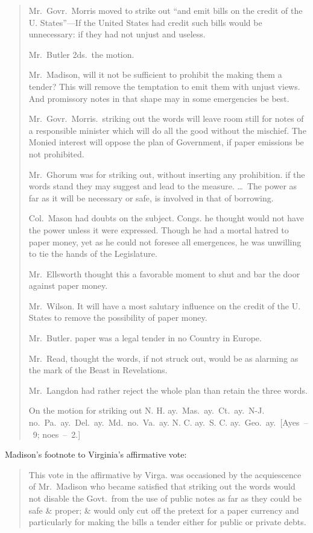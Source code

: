 \documentclass[12pt]{article}
\begin{document}
\begin{quotation}
\noindent Mr.\ Govr.\ Morris moved to strike out ``and emit bills on
the credit of the U. States''---If the United States had credit such
bills would be unnecessary: if they had not unjust and useless.

Mr.\ Butler 2ds.\ the motion.

Mr.\ Madison, will it not be sufficient to prohibit the making them
a tender? This will remove the temptation to emit them with unjust
views. And promissory notes in that shape may in some emergencies
be best.

Mr.\ Govr.\ Morris.\ striking out the words will leave room still for
notes of a responsible minister which will do all the good without
the mischief. The Monied interest will oppose the plan of Government,
if paper emissions be not prohibited.

Mr.\ Ghorum was for striking out, without inserting any prohibition.
if the words stand they may suggest and lead to the measure. \ldots\
The power as far as it will be necessary or safe, is involved in that
of borrowing.

Col.\ Mason had doubts on the subject. Congs. he thought would not
have the power unless it were expressed. Though he had a mortal
hatred to paper money, yet as he could not foresee all emergences,
he was unwilling to tie the hands of the Legislature.

Mr.\ Ellsworth thought this a favorable moment to shut and bar the
door against paper money.

Mr.\ Wilson. It will have a most salutary influence on the credit of
the U. States to remove the possibility of paper money.

Mr.\ Butler. paper was a legal tender in no Country in Europe.

Mr.\ Read, thought the words, if not struck out, would be as alarming
as the mark of the Beast in Revelations.

Mr.\ Langdon had rather reject the whole plan than retain the three
words.

On the motion for striking out N. H. ay.\ Mas.\ ay.\ Ct.\ ay.\ N-J.
no.\ Pa.\ ay.\ Del.\ ay.\ Md.\ no.\ Va.\ ay. N. C. ay.\ S. C. ay.\
Geo.\ ay.\ [Ayes~--~9; noes~--~2.]
\end{quotation}

Madison's footnote to Virginia's affirmative vote:

\begin{quotation}
\noindent This vote in the affirmative by Virga. was occasioned by the
acquiescence of Mr.\ Madison who became satisfied that striking out the
words would not disable the Govt.\ from the use of public notes as far
as they could be safe \& proper; \& would only cut off the pretext for
a paper currency and particularly for making the bills a tender either
for public or private debts.
\end{quotation}
\end{document}
